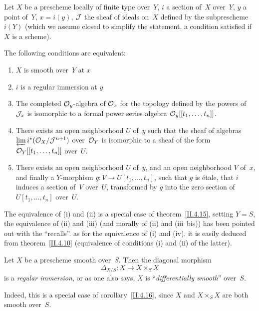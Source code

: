 \begin{corollary}
\label{II.4.17}
Let $X$ be a prescheme locally of finite type over~$Y$, $i$
a section of~$X$ over~$Y$, $y$ a point of~$Y$, $x=i(y)$, $\cal{J}$
the sheaf of ideals on~$X$ defined by the
subprescheme $i(Y)$ (which we assume closed to
simplify the statement, a condition satisfied if $X$ is a
scheme).

The following conditions are equivalent:
\begin{enumerate}
\item[(i)] $X$ is smooth over~$Y$ at $x$
\item[(ii)] $i$ is a regular immersion at $y$
\item[(iii)] The completed $\cal{O}_y$-algebra of
$\cal{O}_x$ for the topology defined by the powers of
$\cal{J}_x$ is isomorphic to a formal power
series algebra $\cal{O}_y[[ t_1,\dots,t_n]]$.
\item[(iii~bis)] There exists an open neighborhood $U$ of~$y$ such that
the sheaf of algebras\linebreak
$\varprojlim i^*(\cal{O}_X/\cal{J}^{n+1})$
over~$\cal{O}_Y$ is isomorphic to a sheaf of the form
$\cal{O}_Y[[ t_1,\dots, t_n]]$ over~$U$.
\item[(iv)] There exists an open neighborhood $U$ of~$y$, and an
open neighborhood $V$ of~$x$, and finally a $Y$-morphism $g \colon V \to
U[t_1,\dots, t_n]$, such that $g$ is \'etale, that
$i$ induces a section of~$V$ over~$U$, transformed by $g$ into the
zero section of~$U[t_1,\dots, t_n]$ over~$U$.
\end{enumerate}
\end{corollary}

The equivalence
of (i) and (ii) is a special case of
theorem~\ref{II.4.15}, setting $Y=S$, the equivalence of
(ii) and (iii) (and morally of (ii) and (iii~bis)) has been
pointed out with the ``recalls''. as for the equivalence of (i)
and (iv), it is easily deduced from
theorem~\ref{II.4.10} (equivalence of conditions (i) and
(ii) of the latter).

\begin{corollary}
\label{II.4.18}
Let $X$ be a prescheme smooth over~$S$. Then the
diagonal morphism
\[
\Delta_{X/S}\colon X\to X\times_S X
\]
is a
\emph{regular immersion},
or as one also says, $X$ is ``\emph{differentially
smooth}'' over~$S$.
\end{corollary}

Indeed, this is a special case of corollary~\ref{II.4.16}, since
$X$ and $X\times_S X$ are both smooth over~$S$.

